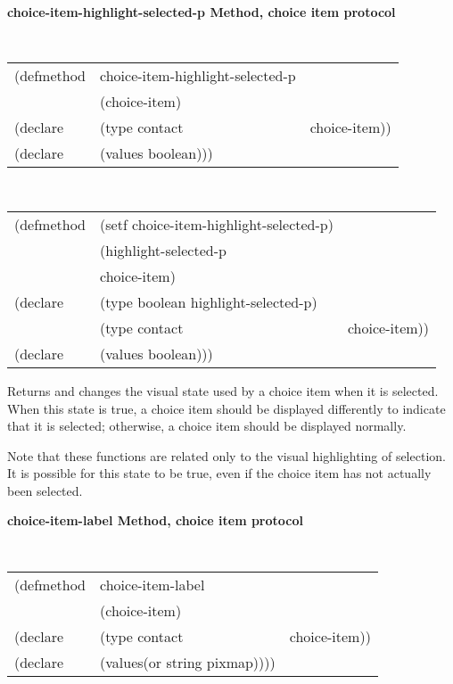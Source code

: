 {\samepage
{\large {\bf choice-item-highlight-selected-p \hfill Method, choice item protocol}}
\begin{flushright} \parbox[t]{6.125in}{
\tt
\begin{tabular}{lll}
\raggedright
(defmethod & choice-item-highlight-selected-p & \\
& (choice-item) \\
(declare &(type contact & choice-item))\\
(declare & (values boolean)))
\end{tabular}
\rm

}\end{flushright}}

{\samepage
\begin{flushright} \parbox[t]{6.125in}{
\tt
\begin{tabular}{lll}
\raggedright
(defmethod & (setf choice-item-highlight-selected-p) & \\
         & (highlight-selected-p \\
         & choice-item) \\
(declare &(type boolean  highlight-selected-p)\\
         &(type contact & choice-item))\\
(declare & (values boolean)))
\end{tabular}
\rm
}
\end{flushright}}

\begin{flushright} \parbox[t]{6.125in}{
Returns and changes the visual state used by a choice item when it is
selected. When this state is true, a choice item should be displayed
differently to indicate that it is selected; otherwise, a choice
item should be displayed normally.

Note that these functions are related only to the visual highlighting of
selection. It is possible for this state to be true, even if the choice item
has not actually been selected.

}\end{flushright}

{\samepage
{\large {\bf choice-item-label \hfill Method, choice item protocol}}
\begin{flushright} \parbox[t]{6.125in}{
\tt
\begin{tabular}{lll}
\raggedright
(defmethod & choice-item-label & \\
& (choice-item) \\
(declare &(type contact & choice-item))\\
(declare & (values(or string pixmap))))
\end{tabular}
\rm

}\end{flushright}}



